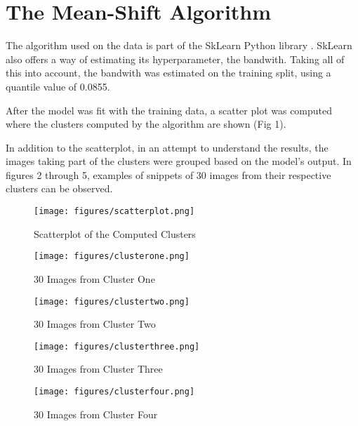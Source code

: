 \documentclass{article}
\begin{document}
\section{The Mean-Shift Algorithm}
The algorithm used on the data is part of the SkLearn Python library \cite{sklearnms}. SkLearn also offers a way of estimating its hyperparameter, the bandwith. Taking all of this into account, the bandwith was estimated on the training split, using a quantile value of 0.0855.

After the model was fit with the training data, a scatter plot was computed where the clusters computed by the algorithm are shown (Fig 1).

In addition to the scatterplot, in an attempt to understand the results, the images taking part of the clusters were grouped based on the model's output. In figures 2 through 5, examples of snippets of 30 images from their respective clusters can be observed.

\newpage

\begin{figure}[h]
	\centering
	\texttt{[image: figures/scatterplot.png]}
	\caption{Scatterplot of the Computed Clusters}
\end{figure}

\begin{figure}[!ht]
	\centering
	\texttt{[image: figures/clusterone.png]}
	\caption{30 Images from Cluster One}
\end{figure}

\begin{figure}[!ht]
	\centering
	\texttt{[image: figures/clustertwo.png]}
	\caption{30 Images from Cluster Two}
\end{figure}

\begin{figure}[!ht]
	\centering
	\texttt{[image: figures/clusterthree.png]}
	\caption{30 Images from Cluster Three}
\end{figure}

\begin{figure}[!ht]
	\centering
	\texttt{[image: figures/clusterfour.png]}
	\caption{30 Images from Cluster Four}
\end{figure}

\newpage 
\end{document}
